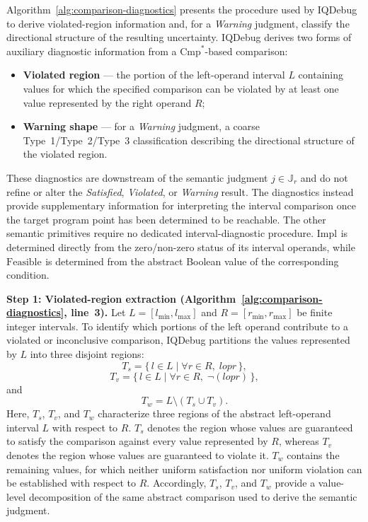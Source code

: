 \documentclass[11pt,oneside]{report}
\theoremstyle{plain}
\theoremstyle{definition}
\theoremstyle{remark}
\begin{document}
Algorithm~\ref{alg:comparison-diagnostics} presents the procedure used by
IQDebug to derive violated-region information and, for a \textit{Warning}
judgment, classify the directional structure of the resulting uncertainty.
IQDebug derives two forms of auxiliary diagnostic information from a
$\mathrm{Cmp}^{*}$-based comparison:
\begin{itemize}
    \item \textbf{Violated region} --- the portion of the left-operand interval
    $L$ containing values for which the specified comparison can be violated by
    at least one value represented by the right operand $R$;
    \item \textbf{Warning shape} --- for a \textit{Warning} judgment, a coarse
    Type~1/Type~2/Type~3 classification describing the directional structure
    of the violated region.
\end{itemize}

These diagnostics are downstream of the semantic judgment
$j\in\mathbb{J}_{r}$ and do not refine or alter the
\textit{Satisfied}, \textit{Violated}, or \textit{Warning} result.
The diagnostics instead provide supplementary information for interpreting
the interval comparison once the target program point has been determined to
be reachable.
The other semantic primitives require no dedicated interval-diagnostic
procedure.
$\mathrm{Impl}^{}$ is determined directly from the zero/non-zero status of
its interval operands, while $\mathrm{Feasible}^{}$ is determined from the
abstract Boolean value of the corresponding condition.

\smallskip
\noindent\textbf{Step 1: Violated-region extraction
(Algorithm~\ref{alg:comparison-diagnostics}, line~3).}
Let $L=[l_{\min},l_{\max}]$ and
$R=[r_{\min},r_{\max}]$ be finite integer intervals.
To identify which portions of the left operand contribute to a violated or
inconclusive comparison, IQDebug partitions the values represented by $L$
into three disjoint regions:
\[
T_s
=
\{\,l\in L
\mid
\forall r\in R,\;
l\mathrel{op}r
\,\},
\]
\[
T_v
=
\{\,l\in L
\mid
\forall r\in R,\;
\neg(l\mathrel{op}r)
\,\},
\]
and
\[
T_w
=
L\setminus(T_s\cup T_v).
\]
Here, $T_s$, $T_v$, and $T_w$ characterize three regions of the abstract
left-operand interval $L$ with respect to $R$.
$T_s$ denotes the region whose values are guaranteed to satisfy the comparison
against every value represented by $R$, whereas $T_v$ denotes the region whose
values are guaranteed to violate it.
$T_w$ contains the remaining values, for which neither uniform satisfaction nor
uniform violation can be established with respect to $R$.
Accordingly, $T_s$, $T_v$, and $T_w$ provide a value-level decomposition of the
same abstract comparison used to derive the semantic judgment.
\end{document}
